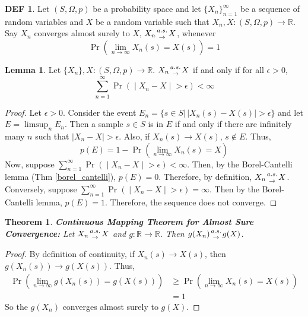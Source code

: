 \documentclass{article}
\newtheorem{theorem}{Theorem}
\theoremstyle{definition}\newtheorem{definition}{DEF}
\theoremstyle{definition}\newtheorem{example}{Ex}
\theoremstyle{lemma}\newtheorem{lemma}{Lemma}
\theoremstyle{corrolary}\newtheorem{corrolary}{Cor}
\begin{document}
\begin{definition}
Let $(S, \Omega, p)$ be a probability space and let $\{X_n \}_{n=1}^\infty$ be a sequence of random variables and $X$ be a random variable such that $X_n, X: (S, \Omega, p)\rightarrow \mathbb{R}$.
Say $X_n$ converges almost surely to $X$, $X_n {a.s. \atop \rightarrow} X$, whenever
\begin{equation}
\Pr\left( \lim_{n\rightarrow \infty} X_n(s) = X(s)\right) = 1
\end{equation}
\end{definition}

\begin{lemma}
Let $\{ X_n \}, X: (S, \Omega, p) \rightarrow \mathbb{R}$.
$X_n {a.s. \atop \rightarrow} X$ if and only if for all $\epsilon>0$,
\begin{equation}
\sum_{n=1}^\infty \Pr \left( \middle| X_n - X \middle| > \epsilon \right) < \infty
\end{equation}
\end{lemma}
\begin{proof}
Let $\epsilon >0$.
Consider the event $E_n = \{ s\in S | \, |X_n(s)-X(s)|>\epsilon \}$ and let $E=\limsup_n E_n$.
Then a sample $s\in S$ is in $E$ if and only if there are infinitely many $n$ such that $|X_n -X|>\epsilon$.
Also, if $X_n(s) \rightarrow X(s)$, $s\notin E$.
Thus,
\begin{equation*}
p(E)=1-\Pr\left(\lim_{n\rightarrow \infty} X_n(s) = X \right)
\end{equation*}
Now, suppose $\sum_{n=1}^\infty \Pr \left( \middle| X_n - X \middle| > \epsilon \right) < \infty$.
Then, by the Borel-Cantelli lemma (Thm \ref{borel_cantelli}), $p(E)=0$.
Therefore, by definition, $X_n {a.s. \atop \rightarrow} X$. \\
Conversely, suppose $\sum_{n=1}^\infty \Pr \left( \middle| X_n - X \middle| > \epsilon \right) = \infty$.
Then by the Borel-Cantelli lemma, $p(E)=1$.
Therefore, the sequence does not converge.
\end{proof}

\begin{theorem}
\textbf{Continuous Mapping Theorem for Almost Sure Convergence:}
Let $X_n {a.s. \atop \rightarrow} X$ and $g: \mathbb{R} \rightarrow \mathbb{R}$.
Then $g(X_n) {a.s. \atop \rightarrow} g(X)$.
\end{theorem}
\begin{proof}
By definition of continuity, if $X_n(s) \rightarrow X(s)$, then $g(X_n(s)) \rightarrow g(X(s))$.
Thus,
\begin{align*}
\Pr\left( \lim_{n\rightarrow \infty} g(X_n(s)) = g(X(s)) \right)
&\geq \Pr\left( \lim_{n\rightarrow \infty} X_n(s) = X(s)\right)\\
&= 1
\end{align*}
So the $g(X_n)$ converges almost surely to $g(X)$.
\end{proof}
\end{document}
